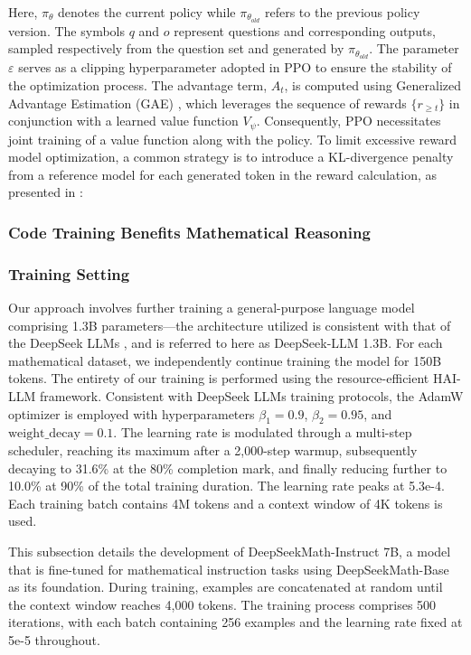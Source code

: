 Here, $\pi_{\theta}$ denotes the current policy while $\pi_{\theta_{old}}$ refers to the previous policy version. The symbols $q$ and $o$ represent questions and corresponding outputs, sampled respectively from the question set and generated by $\pi_{\theta_{old}}$. The parameter $\varepsilon$ serves as a clipping hyperparameter adopted in PPO to ensure the stability of the optimization process. The advantage term, $A_t$, is computed using Generalized Advantage Estimation (GAE) \citep{gae}, which leverages the sequence of rewards $\{r_{\ge t}\}$ in conjunction with a learned value function $V_{\psi}$. Consequently, PPO necessitates joint training of a value function along with the policy. To limit excessive reward model optimization, a common strategy is to introduce a KL-divergence penalty from a reference model for each generated token in the reward calculation, as presented in \citep{ouyang2022training}:

\subsubsection{Code Training Benefits Mathematical Reasoning}

\subsubsection{Training Setting}
\label{sec:quality-policy}
Our approach involves further training a general-purpose language model comprising 1.3B parameters—the architecture utilized is consistent with that of the DeepSeek LLMs \citep{deepseek-llm}, and is referred to here as DeepSeek-LLM 1.3B. For each mathematical dataset, we independently continue training the model for 150B tokens. The entirety of our training is performed using the resource-efficient HAI-LLM \citep{haillm} framework. Consistent with DeepSeek LLMs training protocols, the AdamW optimizer \citep{adamW} is employed with hyperparameters $\beta_1=0.9$, $\beta_2=0.95$, and $\mathrm{weight\_decay}=0.1$. The learning rate is modulated through a multi-step scheduler, reaching its maximum after a 2,000-step warmup, subsequently decaying to 31.6\% at the 80\% completion mark, and finally reducing further to 10.0\% at 90\% of the total training duration. The learning rate peaks at 5.3e-4. Each training batch contains 4M tokens and a context window of 4K tokens is used.

This subsection details the development of DeepSeekMath-Instruct 7B, a model that is fine-tuned for mathematical instruction tasks using DeepSeekMath-Base as its foundation. During training, examples are concatenated at random until the context window reaches 4,000 tokens. The training process comprises 500 iterations, with each batch containing 256 examples and the learning rate fixed at 5e-5 throughout.

